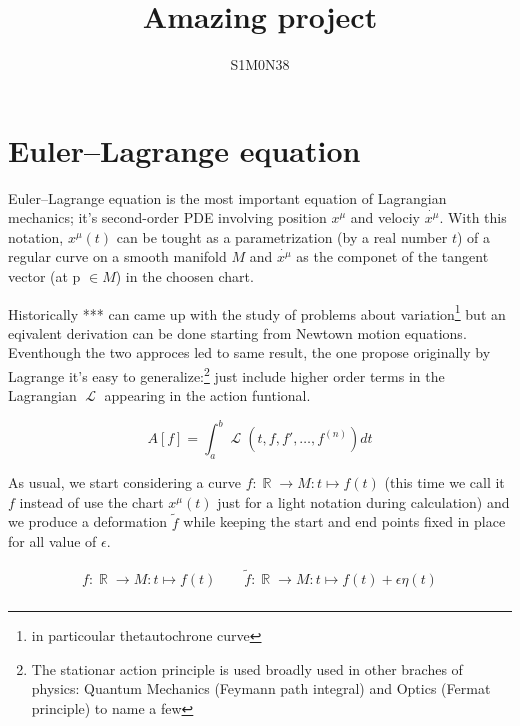 \documentclass[a4paper]{article}
\title{Amazing project}
\author{S1M0N38}
\DeclareMathOperator{\Lagr}{\mathcal{L}} %
\DeclareMathOperator{\R}{\mathbb{R}} %
\begin{document}
  \maketitle
  \newpage

  \begin{abstract}
    \lipsum[1]
  \end{abstract}


  \section{Euler–Lagrange equation}

  Euler–Lagrange equation is the most important equation of Lagrangian
  mechanics; it's second-order PDE involving position $x^{\mu}$ and velociy
  $\dot{x^{\mu}}$. With this notation, $x^{\mu}(t)$ can be tought as a
  parametrization (by a real number $t$) of a regular curve on a smooth
  manifold $M$ and $\dot{x^{\mu}}$ as the componet of the tangent vector (at
  p $\in M$) in the choosen chart.

  Historically *** can came up with the study of problems about
  variation\footnote{in particoular thetautochrone curve} but an eqivalent
  derivation can be done starting from Newtown motion equations.
  Eventhough the two approces led to same result, the one
  propose originally by Lagrange it's easy to generalize:\footnote{The
  stationar action principle is used broadly used in other braches of physics:
  Quantum Mechanics (Feymann path integral) and Optics (Fermat principle) to
  name a few} just include higher order terms in the Lagrangian $\Lagr$
  appearing in the action funtional.

  \begin{equation*}
    A[f] = \int_{a}^{b} \Lagr(t, f, f', \ldots, f^{(n)}) dt
  \end{equation*}

  As usual, we start considering a curve $f: \R \rightarrow M: t \mapsto f(t)$
  (this time we call it $f$ instead of use the chart $x^{\mu}(t)$ just for
  a light notation during calculation) and we produce a deformation $\tilde{f}$
  while keeping the start and end points fixed in place for all value of
  $\epsilon$.

  \begin{gather*}
    f:  \R \rightarrow M: t \mapsto f(t) \qquad
    \tilde{f} : \R \rightarrow M: t \mapsto f(t) + \epsilon\eta(t) \\
  \end{gather*}
\end{document}

